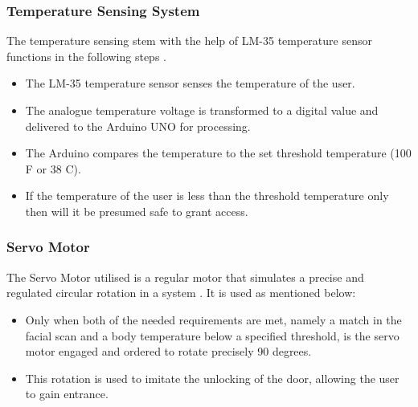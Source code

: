 \documentclass[conference]{IEEEtran}
\begin{document}
	\subsubsection{Temperature Sensing System}
	The temperature sensing
	stem with the help of LM-35 temperature sensor functions
	in the following steps \cite{12}.
	\begin{itemize}
		\item The LM-35 temperature sensor senses the
		temperature of the user.
		\item The analogue temperature voltage is transformed to a digital value and delivered to the Arduino UNO for processing.
		\item The Arduino compares the temperature to the set
		threshold temperature (100 F or 38 C).
		\item If the temperature of the user is less than the
		threshold temperature only then will it be presumed safe to
		grant access.\\
	\end{itemize}
	\subsubsection{Servo Motor}
	The Servo Motor utilised is a regular motor that simulates a precise and regulated circular rotation in a system \cite{13}. It is used as mentioned below:
	\begin{itemize}
		\item Only when both of the needed requirements are met, namely a match in the facial scan and a body temperature below a specified threshold, is the servo motor engaged and ordered to rotate precisely 90 degrees.
		\item This rotation is used to imitate the unlocking of the door, allowing the user to gain entrance.\\\\
	\end{itemize}
	
\end{document}
